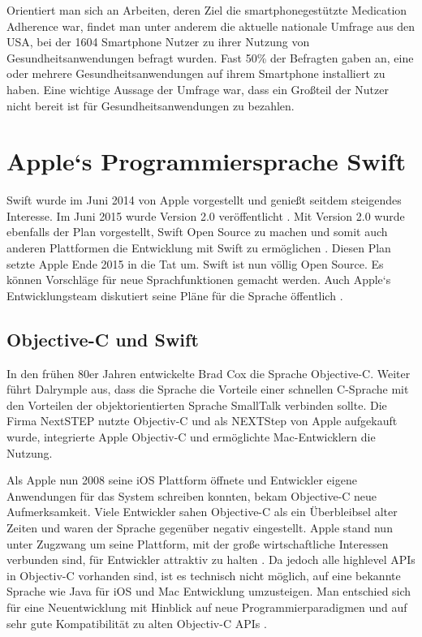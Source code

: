 Orientiert man sich an Arbeiten, deren Ziel die smartphonegestützte Medication Adherence war, findet man unter anderem die aktuelle nationale Umfrage \cite{Krebs-P:2015aa} aus den USA, bei der 1604 Smartphone Nutzer zu ihrer Nutzung von Gesundheitsanwendungen befragt wurden. Fast 50\% der Befragten gaben an, eine oder mehrere Gesundheitsanwendungen auf ihrem Smartphone installiert zu haben. Eine wichtige Aussage der Umfrage war, dass ein Großteil der Nutzer nicht bereit ist für Gesundheitsanwendungen zu bezahlen.

\section{Apple`s Programmiersprache Swift}
Swift wurde im Juni 2014 von Apple vorgestellt und genießt seitdem steigendes Interesse. Im Juni 2015 wurde Version 2.0 veröffentlicht \cite{Apple:2014sp}. Mit Version 2.0 wurde ebenfalls der Plan vorgestellt, Swift Open Source zu machen und somit auch anderen Plattformen die Entwicklung mit Swift zu ermöglichen \cite{Apple:2014sp}. Diesen Plan setzte Apple Ende 2015 in die Tat um. Swift ist nun völlig Open Source. Es können Vorschläge für neue Sprachfunktionen gemacht werden. Auch Apple`s Entwicklungsteam diskutiert seine Pläne für die Sprache öffentlich \cite{Apple:2015swiftOpen}.

\subsection{Objective-C und Swift}
In den frühen 80er Jahren entwickelte Brad Cox die Sprache Objective-C\cite{Dalrymple:2009aa}. Weiter führt Dalrymple aus, dass die Sprache  die Vorteile einer schnellen C-Sprache mit den Vorteilen der objektorientierten Sprache SmallTalk verbinden sollte. Die Firma NextSTEP nutzte Objectiv-C und als NEXTStep von Apple aufgekauft wurde, integrierte Apple Objectiv-C und ermöglichte Mac-Entwicklern die Nutzung.

 Als Apple nun 2008 seine iOS Plattform öffnete und Entwickler eigene Anwendungen für das System schreiben konnten, bekam Objective-C neue Aufmerksamkeit. Viele Entwickler sahen Objective-C als ein Überbleibsel alter Zeiten und waren der Sprache gegenüber negativ eingestellt. Apple stand nun unter Zugzwang um seine Plattform, mit der große wirtschaftliche Interessen verbunden sind, für Entwickler attraktiv zu halten \cite{Wells:2015fu}. Da jedoch alle highlevel APIs in Objectiv-C vorhanden sind, ist es technisch nicht möglich, auf eine bekannte Sprache wie Java für iOS und Mac Entwicklung umzusteigen. Man entschied sich für eine Neuentwicklung mit Hinblick auf neue Programmierparadigmen und auf sehr gute Kompatibilität zu alten Objectiv-C APIs \cite{Wells:2015fu}.

